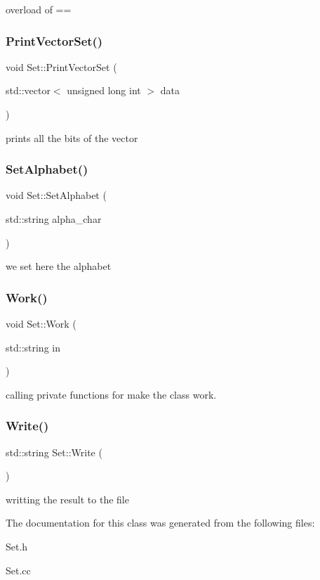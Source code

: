 overload of == \mbox{\label{classSet_a167b6d87b1698a61f269835c34c455cc}} 
\subsubsection{\texorpdfstring{Print\+Vector\+Set()}{PrintVectorSet()}}
{\footnotesize\ttfamily void Set\+::\+Print\+Vector\+Set (\begin{DoxyParamCaption}\item[{std\+::vector$<$ unsigned long int $>$}]{data }\end{DoxyParamCaption})}

prints all the bits of the vector \mbox{\label{classSet_abd4f422aa428bed3afba157f4a18c90f}} 
\subsubsection{\texorpdfstring{Set\+Alphabet()}{SetAlphabet()}}
{\footnotesize\ttfamily void Set\+::\+Set\+Alphabet (\begin{DoxyParamCaption}\item[{std\+::string}]{alpha\+\_\+char }\end{DoxyParamCaption})}

we set here the alphabet \mbox{\label{classSet_aa25ad5b9d72e4d428eb564b2eb208e3b}} 
\subsubsection{\texorpdfstring{Work()}{Work()}}
{\footnotesize\ttfamily void Set\+::\+Work (\begin{DoxyParamCaption}\item[{std\+::string}]{in }\end{DoxyParamCaption})}

calling private functions for make the class work. \mbox{\label{classSet_afc0f35a8d6903b892bb283813511fea9}} 
\subsubsection{\texorpdfstring{Write()}{Write()}}
{\footnotesize\ttfamily std\+::string Set\+::\+Write (\begin{DoxyParamCaption}{ }\end{DoxyParamCaption})}

writting the result to the file 

The documentation for this class was generated from the following files\+:\begin{DoxyCompactItemize}
\item 
Set.\+h\item 
Set.\+cc\end{DoxyCompactItemize}
